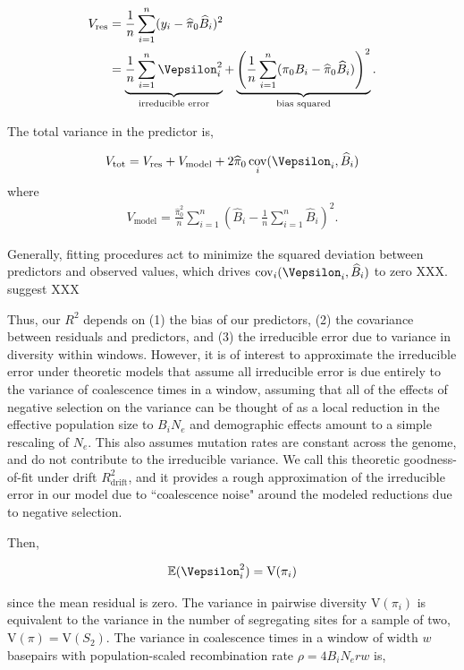 \documentclass[11pt]{article}
\newcommand{\E}{\mathbb{E}}
\newcommand{\V}{\text{V}}
\newcommand{\V}{\text{V}}
\DeclareMathOperator{\cov}{cov}
\begin{document}
\begin{align}
    V_\text{res} &= \frac{1}{n} \sum_{i=1}^n (y_i - \widehat{\pi}_0 \widehat{B}_i)^2  \\
                 &= \underbrace{\frac{1}{n} \sum_{i=1}^n \Vepsilon_i^2}_\text{irreducible error} + \underbrace{\left(\frac{1}{n} \sum_{i=1}^n (\pi_0 B_i - \widehat{\pi}_0 \widehat{B}_i)\right)^2}_\text{bias squared}.
\end{align}

The total variance in the predictor is,

\begin{align}
    V_\text{tot} = V_\text{res} + V_\text{model} + 2\widehat{\pi}_0\cov_i(\Vepsilon_i, \widehat{B}_i)
\end{align}
where 
\begin{align}
    V_\text{model} = \frac{\widehat{\pi}_0^2}{n} \sum_{i=1}^n \left(\widehat{B}_i - \frac{1}{n}\sum_{i=1}^n\widehat{B}_i\right)^2.
\end{align}

Generally, fitting procedures act to minimize the squared deviation between
predictors and observed values, which drives $\cov_i(\Vepsilon_i,
\widehat{B}_i)$ to zero XXX. \textcite{Murphy2022-sj} suggest  XXX 

Thus, our $R^2$ depends on (1) the bias of our predictors, (2) the covariance
between residuals and predictors, and (3) the irreducible error due to variance
in diversity within windows. However, it is of interest to approximate the
irreducible error under theoretic models that assume all irreducible error is
due entirely to the variance of coalescence times in a window, assuming that
all of the effects of negative selection on the variance can be thought of as a
local reduction in the effective population size to $B_i N_e$ and demographic
effects amount to a simple rescaling of $N_e$. This also assumes mutation rates
are constant across the genome, and do not contribute to the irreducible
variance. We call this theoretic goodness-of-fit under drift
$R_\text{drift}^2$, and it provides a rough approximation of the irreducible
error in our model due to ``coalescence noise" around the modeled reductions
due to negative selection.

Then, 

\begin{align}
    \E(\Vepsilon_i^2) = \V(\pi_i)
\end{align}

since the mean residual is zero. The variance in pairwise diversity
$\V(\pi_i)$ is equivalent to the variance in the number of segregating sites
for a sample of two, $\V(\pi) = \V(S_2)$. The variance in coalescence times
in a window of width $w$ basepairs with population-scaled recombination rate
$\rho = 4 B_i N_e r w$ is,
\end{document}

